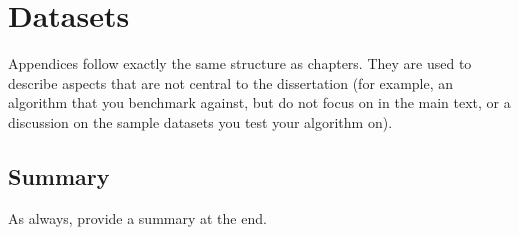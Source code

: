 \chapter{Datasets}
\label{app:datasets}

Appendices follow exactly the same structure as chapters. They are used to
describe aspects that are not central to the dissertation (for example, an
algorithm that you benchmark against, but do not focus on in the main text, or a
discussion on the sample datasets you test your algorithm on).

\section{Summary}
\label{app:datasets:summary}

As always, provide a summary at the end.


